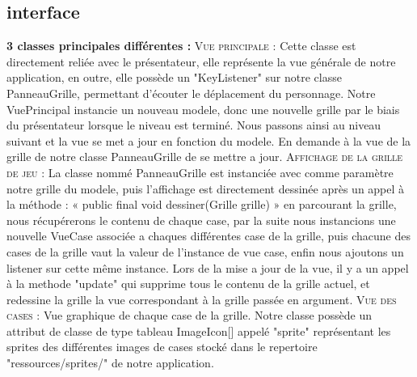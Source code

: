 \documentclass[a4paper,12pt]{article} %
\begin{document}
\subsection{interface}
\noindent
\textbf{3 classes principales différentes :}
\newline\newline
\textsc{Vue principale :} 
\newline\newline
Cette classe est directement reliée avec le présentateur, elle représente la vue générale de notre application, en outre, elle possède un "KeyListener" sur notre classe PanneauGrille, permettant d'écouter le déplacement du personnage.
\newline\newline
Notre VuePrincipal instancie un nouveau modele, donc une nouvelle grille par le biais du présentateur lorsque le niveau est terminé. Nous passons ainsi au niveau suivant et la vue se met a jour en fonction du modele. En demande à la vue de la grille de notre classe PanneauGrille de se mettre a jour.
\newline\newline
\textsc{Affichage de la grille de jeu :}
\newline\newline
La classe nommé PanneauGrille est instanciée avec comme paramètre notre grille du modele, puis l'affichage est directement dessinée après un appel à la méthode : « public final void dessiner(Grille grille) » en parcourant la grille, nous récupérerons le contenu de chaque case, par la suite nous instancions une nouvelle VueCase associée a chaques différentes case de la grille, puis chacune des cases de la grille vaut la valeur de l'instance de vue case, enfin nous ajoutons un listener sur cette même instance. Lors de la mise a jour de la vue, il y a un appel à la methode "update" qui supprime tous le contenu de la grille actuel, et redessine la grille la vue correspondant à la grille passée en argument.
\newline\newline
\textsc{Vue des cases :}
\newline\newline
Vue graphique de chaque case de la grille.
Notre classe possède un attribut de classe de type tableau ImageIcon[] appelé "sprite" représentant les sprites des différentes images de cases stocké dans le repertoire "ressources/sprites/" de notre application.
\newline\newline
\end{document}
